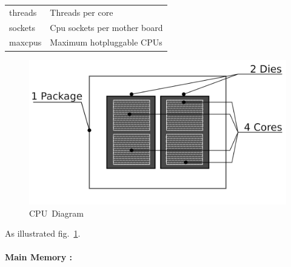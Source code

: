 \documentclass[
  14pt,
  english,
  a4paper,
]{scrreprt}
\begin{document}
\begin{longtable}[]{@{}ll@{}}
\begin{minipage}[t]{0.16\columnwidth}\raggedright
threads\strut
\end{minipage} & \begin{minipage}[t]{0.41\columnwidth}\raggedright
Threads per core\strut
\end{minipage}\tabularnewline
\begin{minipage}[t]{0.16\columnwidth}\raggedright
sockets\strut
\end{minipage} & \begin{minipage}[t]{0.41\columnwidth}\raggedright
Cpu sockets per mother board\strut
\end{minipage}\tabularnewline
\begin{minipage}[t]{0.16\columnwidth}\raggedright
maxcpus\strut
\end{minipage} & \begin{minipage}[t]{0.41\columnwidth}\raggedright
Maximum hotpluggable CPUs\strut
\end{minipage}\tabularnewline
\bottomrule
\end{longtable}

\begin{figure}
\hypertarget{fig:cpudiagram}{%
\centering
\includegraphics[width=1\textwidth,height=\textheight]{figures/cpu_diagram.png}
\caption{CPU~Diagram}\label{fig:cpudiagram}
}
\end{figure}

As illustrated fig.~\ref{fig:cpudiagram}.

\hypertarget{main-memory}{%
\paragraph*{Main Memory :}\label{main-memory}}
\end{document}
